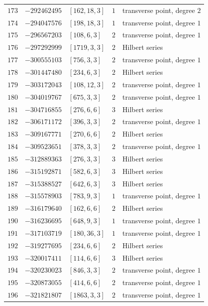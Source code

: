 \documentclass[11pt]{article}
\begin{document}
\begin{center}
\begin{longtable}{r r l c l}
$173$ & $-292462495$ & $[162,18,3]$ & $1$ & transverse point, degree $2$\\
$174$ & $-294047576$ & $[198,18,3]$ & $1$ & transverse point, degree $1$\\
$175$ & $-296567203$ & $[108,6,3]$ & $2$ & transverse point, degree $1$\\
$176$ & $-297292999$ & $[1719,3,3]$ & $2$ & Hilbert series\\
$177$ & $-300555103$ & $[756,3,3]$ & $2$ & transverse point, degree $1$\\
$178$ & $-301447480$ & $[234,6,3]$ & $2$ & Hilbert series\\
$179$ & $-303172043$ & $[108,12,3]$ & $2$ & transverse point, degree $1$\\
$180$ & $-304019767$ & $[675,3,3]$ & $2$ & transverse point, degree $1$\\
$181$ & $-304716855$ & $[276,6,6]$ & $3$ & Hilbert series\\
$182$ & $-306171172$ & $[396,3,3]$ & $2$ & transverse point, degree $1$\\
$183$ & $-309167771$ & $[270,6,6]$ & $2$ & Hilbert series\\
$184$ & $-309523651$ & $[378,3,3]$ & $2$ & transverse point, degree $1$\\
$185$ & $-312889363$ & $[276,3,3]$ & $3$ & Hilbert series\\
$186$ & $-315192871$ & $[582,6,3]$ & $3$ & Hilbert series\\
$187$ & $-315388527$ & $[642,6,3]$ & $3$ & Hilbert series\\
$188$ & $-315578903$ & $[783,9,3]$ & $1$ & transverse point, degree $1$\\
$189$ & $-316179640$ & $[162,6,6]$ & $2$ & Hilbert series\\
$190$ & $-316236695$ & $[648,9,3]$ & $1$ & transverse point, degree $1$\\
$191$ & $-317103719$ & $[180,36,3]$ & $1$ & transverse point, degree $1$\\
$192$ & $-319277695$ & $[234,6,6]$ & $2$ & Hilbert series\\
$193$ & $-320017411$ & $[114,6,6]$ & $3$ & Hilbert series\\
$194$ & $-320230023$ & $[846,3,3]$ & $2$ & transverse point, degree $1$\\
$195$ & $-320873055$ & $[414,6,6]$ & $2$ & transverse point, degree $1$\\
$196$ & $-321821807$ & $[1863,3,3]$ & $2$ & transverse point, degree $1$\\

\end{longtable}
\end{center}
\end{document}
